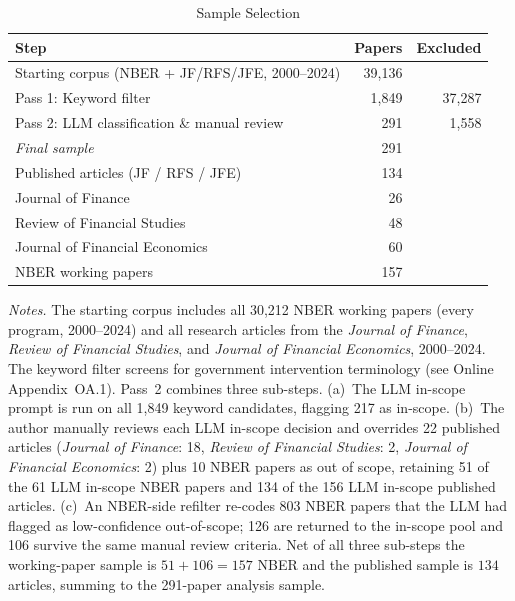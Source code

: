 \documentclass[12pt]{article}
\newcommand{\JF}{\textit{Journal of Finance}}
\newcommand{\RFS}{\textit{Review of Financial Studies}}
\newcommand{\JFE}{\textit{Journal of Financial Economics}}
\begin{document}
\begin{table}[H]
\centering
\caption{Sample Selection}
\label{tab:sample_selection}
\begin{singlespace}
\begin{tabular}{lrr}
\toprule
Step & Papers & Excluded \\
\midrule
Starting corpus (NBER + JF/RFS/JFE, 2000--2024) & 39,136 &  \\
Pass 1: Keyword filter                           &  1,849 & 37,287 \\
Pass 2: LLM classification \& manual review      &    291 &  1,558 \\
\midrule
\textit{Final sample}                            &    291 & \\
\quad Published articles (JF / RFS / JFE)        &    134 & \\
\quad\quad Journal of Finance                    &     26 & \\
\quad\quad Review of Financial Studies           &     48 & \\
\quad\quad Journal of Financial Economics        &     60 & \\
\quad NBER working papers                        &    157 & \\
\bottomrule
\end{tabular}
\par\smallskip
\begin{minipage}{\textwidth}
\small
\textit{Notes.} The starting corpus includes all 30,212 NBER working papers
(every program, 2000--2024) and all research articles from the
\JF{}, \RFS{}, and \JFE{}, 2000--2024.  The keyword filter screens for
government intervention terminology (see Online Appendix~OA.1).  Pass~2
combines three sub-steps.  (a)~The LLM in-scope prompt is run on all 1,849
keyword candidates, flagging 217 as in-scope.  (b)~The author manually reviews
each LLM in-scope decision and overrides 22 published articles
(\JF{}: 18, \RFS{}: 2, \JFE{}: 2) plus 10 NBER papers as out of scope,
retaining 51 of the 61 LLM in-scope NBER papers and 134 of the 156 LLM
in-scope published articles.  (c)~An NBER-side refilter re-codes 803 NBER
papers that the LLM had flagged as low-confidence out-of-scope; 126 are
returned to the in-scope pool and 106 survive the same manual review
criteria.  Net of all three sub-steps the working-paper sample is
$51 + 106 = 157$ NBER and the published sample is $134$ articles, summing to
the 291-paper analysis sample.
\end{minipage}
\end{singlespace}
\end{table}
\end{document}
